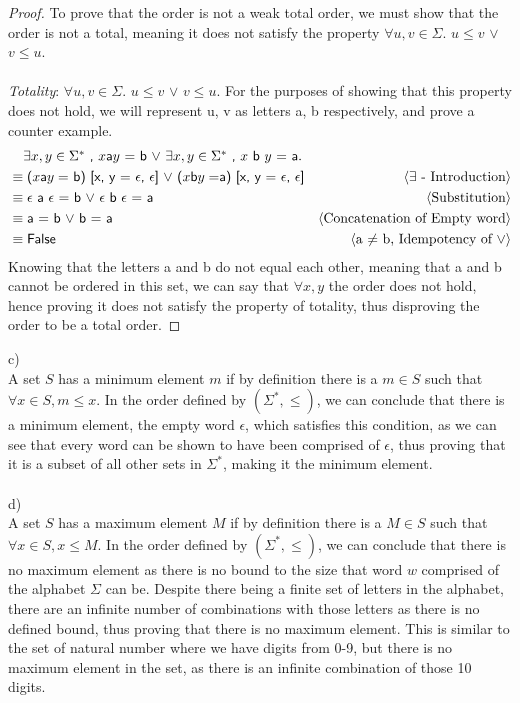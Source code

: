 \documentclass[11pt,fleqn]{article}
\newcommand{\mname}[1]{\mbox{\sf #1}}
\newcommand{\pnote}[1]{{\langle \text{#1} \rangle}}
\newcommand{\Or}{\vee}
\begin{document}
  \begin{proof}
  To prove that the order is not a weak total order, we must show that the order is not a total, meaning it does not satisfy the property $\forall u,v \in \Sigma$. $u \le v$ $\Or$ $v\le u$.  \\\\
  \emph{Totality}: $\forall u,v \in \Sigma$. $u \le v$ $\Or$ $v\le u$. For the purposes of showing that this property does not hold, we will represent u, v as letters a, b respectively, and prove a counter example.
    \begin{align*}
      &\phantom{{}=} \mname {$\exists x, y \in \Sigma^*$ , $x$a$y$ = b $\Or$ $\exists x, y \in \Sigma^*$ , $x$ b $y$ = a}.\\
      &\equiv \mname{($x$a$y =$ b) [x, y = $\epsilon$, $\epsilon$] $\Or$ ($x $b$ y = $a) [x, y = $\epsilon$, $\epsilon$]}  & \pnote{$\exists$ - Introduction}\\
      &\equiv \mname{$\epsilon$ a $\epsilon$ = b $\Or $ $\epsilon$ b $\epsilon$ = a}  & \pnote{Substitution}\\
      &\equiv \mname{a = b $\Or$ b = a}  & \pnote{Concatenation of Empty word}\\
      &\equiv \mname{False}  & \pnote{a $\neq$ b, Idempotency of $\Or$}\\
    \end{align*}
    Knowing that the letters a and b do not equal each other, meaning that a and b cannot be ordered in this set, we can say that $\forall x,y$ the order does not hold, hence proving it does not satisfy the property of totality, thus disproving the order to be a total order. 
  \end{proof}
  c)
  \\
  A set $S$ has a minimum element $m$ if by definition there is a $m \in S$ such that $\forall x \in S, m \le x$. In the order defined by $(\Sigma^*,\le)$, we can conclude that there is a minimum element, the empty word $\epsilon$, which satisfies this condition, as we can see that every word can be shown to have been comprised of $\epsilon$, thus proving that it is a subset of all other sets in $\Sigma^*$, making it the minimum element. 
  \\\\
  d)
  \\
  A set $S$ has a maximum element $M$ if by definition there is a $M \in S$ such that $\forall x \in S, x \le M$. In the order defined by $(\Sigma^*,\le)$, we can conclude that there is no maximum element as there is no bound to the size that word $w$ comprised of the alphabet $\Sigma$ can be. Despite there being a finite set of letters in the alphabet, there are an infinite number of combinations with those letters as there is no defined bound, thus proving that there is no maximum element. This is similar to the set of natural number where we have digits from 0-9, but there is no maximum element in the set, as there is an infinite combination of those 10 digits.
\end{document}
